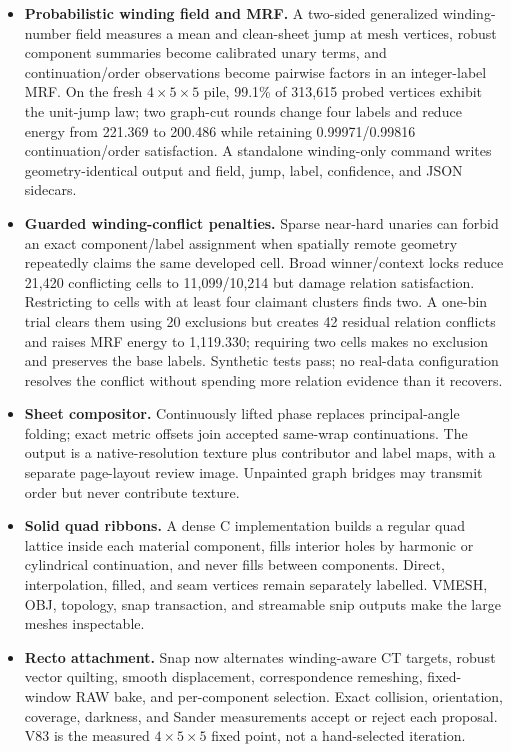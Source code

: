 \begin{revision}
{\begin{itemize}
  \item \textbf{Probabilistic winding field and MRF.} A two-sided generalized winding-number field measures a mean and clean-sheet jump at mesh vertices, robust component summaries become calibrated unary terms, and continuation/order observations become pairwise factors in an integer-label MRF. On the fresh $4\times5\times5$ pile, 99.1\% of 313,615 probed vertices exhibit the unit-jump law; two graph-cut rounds change four labels and reduce energy from 221.369 to 200.486 while retaining 0.99971/0.99816 continuation/order satisfaction. A standalone winding-only command writes geometry-identical output and field, jump, label, confidence, and JSON sidecars.

  \item \textbf{Guarded winding-conflict penalties.} Sparse near-hard unaries can forbid an exact component/label assignment when spatially remote geometry repeatedly claims the same developed cell. Broad winner/context locks reduce 21,420 conflicting cells to 11,099/10,214 but damage relation satisfaction. Restricting to cells with at least four claimant clusters finds two. A one-bin trial clears them using 20 exclusions but creates 42 residual relation conflicts and raises MRF energy to 1,119.330; requiring two cells makes no exclusion and preserves the base labels. Synthetic tests pass; no real-data configuration resolves the conflict without spending more relation evidence than it recovers.

  \item \textbf{Sheet compositor.} Continuously lifted phase replaces principal-angle folding; exact metric offsets join accepted same-wrap continuations. The output is a native-resolution texture plus contributor and label maps, with a separate page-layout review image. Unpainted graph bridges may transmit order but never contribute texture.

  \item \textbf{Solid quad ribbons.} A dense C implementation builds a regular quad lattice inside each material component, fills interior holes by harmonic or cylindrical continuation, and never fills between components. Direct, interpolation, filled, and seam vertices remain separately labelled. VMESH, OBJ, topology, snap transaction, and streamable snip outputs make the large meshes inspectable.

  \item \textbf{Recto attachment.} Snap now alternates winding-aware CT targets, robust vector quilting, smooth displacement, correspondence remeshing, fixed-window RAW bake, and per-component selection. Exact collision, orientation, coverage, darkness, and Sander measurements accept or reject each proposal. V83 is the measured $4\times5\times5$ fixed point, not a hand-selected iteration.


\end{itemize}}
\end{revision}
